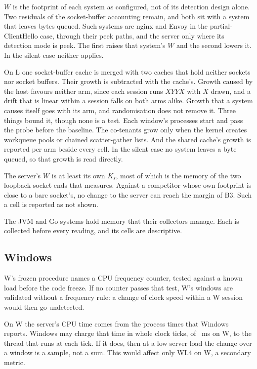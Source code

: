 $W$ is the footprint of each system as configured, not of its detection design alone. Two
residuals of the socket-buffer accounting remain, and both sit with a system that leaves bytes
queued. Such systems are nginx and Envoy in the partial-ClientHello case, through their peek
paths, and the server only where its detection mode is peek. The first raises that system's $W$ and the second lowers
it. In the silent case neither applies.

On L one socket-buffer cache is merged with two caches that hold neither sockets nor socket
buffers. Their growth is subtracted with the cache's. Growth caused by the host favours neither
arm, since each session runs $XYYX$ with $X$ drawn, and a drift that is linear within a session
falls on both arms alike. Growth that a system causes itself goes with its arm, and randomisation
does not remove it. Three things bound it, though none is a test. Each window's processes start
and pass the probe before the baseline. The co-tenants grow only when the kernel creates workqueue
pools or chained scatter-gather lists. And the shared cache's growth is reported per arm beside
every cell. In the silent case no system leaves a byte queued, so that growth is read directly.

The server's $W$ is at least its own $K_s$, most of which is the memory of the two loopback socket
ends that \Kbase{} measures. Against a competitor whose own footprint is close to a bare socket's,
no change to the server can reach the margin of B3. Such a cell is reported as not shown.

The JVM and Go systems hold memory that their collectors manage. Each is collected before every
reading, and its cells are descriptive.

\subsection{Windows}\label{sec:threat-w}

W's frozen procedure names a CPU frequency counter, tested against a known load before the code
freeze. If no counter passes that test, W's windows are validated without a frequency rule: a
change of clock speed within a W session would then go undetected.

On W the server's CPU time comes from the process times that Windows reports. Windows may charge
that time in whole clock ticks, of \WTickMs{}~ms on W, to the thread that runs at each tick. If it
does, then at a low server load the change over a window is a sample, not a sum. This would affect
only WL4 on W, a secondary metric.

